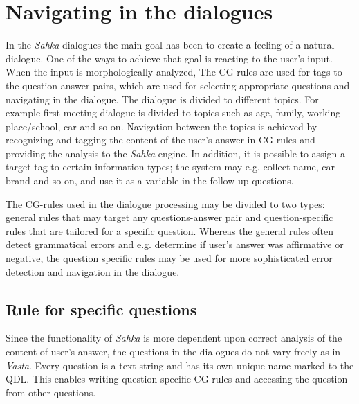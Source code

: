 \documentclass[11pt]{article}
\begin{document}
\section{Navigating in the dialogues}

In the \textit{Sahka} dialogues the main goal has been to create a feeling of a natural dialogue. One of the ways to achieve that goal is reacting to the user's input. When the input is morphologically analyzed, The CG rules are used for tags to the question-answer pairs, which are used for selecting appropriate questions and navigating in the dialogue. The dialogue is divided to different topics. For example first meeting dialogue is divided to topics such as age, family, working place/school, car and so on. Navigation between the topics is achieved by recognizing and tagging the content of the user's answer in CG-rules and providing the analysis to the \textit{Sahka}-engine.  In addition, it is possible to assign a target tag to certain information types; the system may e.g. collect name, car brand and so on, and use it as a variable in the follow-up questions. 

The CG-rules used in the dialogue processing may be divided to two types: general rules that may target any questions-answer pair and question-specific rules that are tailored for a specific question. Whereas the general rules often detect grammatical errors and e.g. determine if user's answer was affirmative or negative, the question specific rules may be used for more sophisticated error detection and navigation in the dialogue.


\subsection{Rule for specific questions}
Since the functionality of \textit{Sahka} is more dependent upon correct analysis of the content of user's answer, the questions in the dialogues do not vary freely as in \textit{Vasta}. Every question is a text string and has its own unique name marked to the QDL.  This enables writing question specific CG-rules and accessing the question from other questions. \\ 
\end{document}

